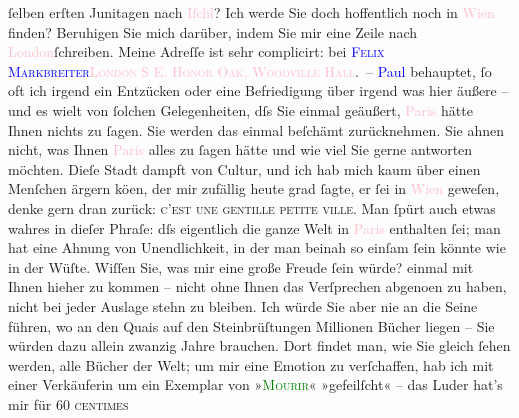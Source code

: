                ſelben erſten Junitagen nach \textcolor{pink}{Iſchl}{}\ledrightnote{\textcolor{pink}{Bad Ischl}}?\pend
           \pstart
           Ich werde Sie doch hoffentlich noch in \textcolor{pink}{Wien}{}\ledrightnote{\textcolor{pink}{Wien}}
               finden? Beruhigen {\pb}Sie mich darüber, indem Sie mir
               eine Zeile nach \textcolor{pink}{London}{}\ledrightnote{\textcolor{pink}{London}}{ }ſchreiben. Meine Adreſſe ist sehr complicirt: bei
                  \textsc{\textcolor{blue}{Felix Markbreiter}{}\ledrightnote{\textcolor{blue}{Felix Markbreiter}}{ }\textcolor{pink}{London S E. Honor Oak, Woodville Hall}{}\ledrightnote{\textcolor{pink}{Honor Oak}}}. –\pend
           \pstart
           \textcolor{blue}{Paul}{}\ledrightnote{\textcolor{blue}{Paul Goldmann}} behauptet, ſo oft ich irgend ein
               Entzücken oder eine Befriedigung über irgend was hier äußere – und es wi{\geminationm}elt von ſolchen Gelegenheiten, dſs Sie einmal ge{\pb}äußert, \textcolor{pink}{Paris}{}\ledrightnote{\textcolor{pink}{Paris}}
               hätte Ihnen nichts zu ſagen. Sie werden das einmal beſchämt zurücknehmen. Sie ahnen
               nicht, was Ihnen \textcolor{pink}{Paris}{}\ledrightnote{\textcolor{pink}{Paris}} alles zu ſagen hätte und
               wie viel Sie gerne antworten möchten. Dieſe Stadt dampft von Cultur, und ich hab mich
               kaum über einen Menſchen ärgern kö{\geminationn}en, der mir zufällig
               heute grad ſagte, er ſei in \textcolor{pink}{Wien}{}\ledrightnote{\textcolor{pink}{Wien}} geweſen, {\pb}denke gern dran zurück: \textsc{c’est une
                  gentille petite ville}. Man ſpürt auch etwas wahres in dieſer Phraſe: dſs
               eigentlich die ganze Welt in \textcolor{pink}{Paris}{}\ledrightnote{\textcolor{pink}{Paris}} enthalten ſei;
               man hat eine Ahnung von Unendlichkeit, in der man beinah so einſam ſein könnte wie in
               der Wüſte. Wiſſen Sie, was mir eine große Freude ſein würde? einmal mit Ihnen hieher
               zu kommen – nicht {\pb}ohne Ihnen das Verſprechen abgeno{\geminationm}en zu haben, nicht bei jeder Auslage stehn zu bleiben.
               Ich würde Sie aber nie an die Seine führen, wo an den Quais auf den Steinbrüſtungen
               Millionen Bücher liegen – Sie würden dazu allein zwanzig Jahre brauchen. Dort findet
               man, wie Sie gleich ſehen werden, alle Bücher der Welt; {\pb}um mir eine Emotion zu verſchaffen, hab ich mit einer
               Verkäuferin um ein Exemplar von »\textcolor{green}{\textsc{Mourir}}{}\ledrightnote{\textcolor{green}{Sterben. Novelle}}« »gefeilſcht« – das Luder hat’s mir für 60 \textsc{centimes}
